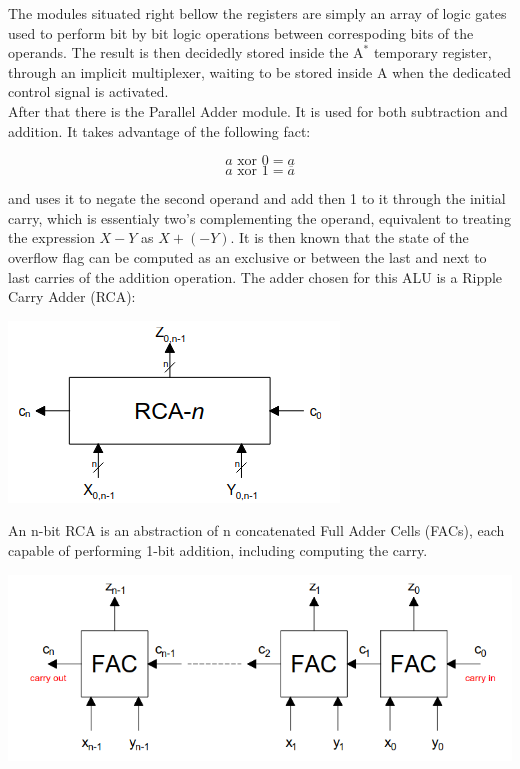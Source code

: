 \documentclass[12pt, letterpaper]{article}
\begin{document}
The modules situated right bellow the registers are simply an array of logic gates used to perform bit by bit logic operations between correspoding bits
of the operands. The result is then decidedly stored inside the $\text{A}^*$ temporary register, through an implicit multiplexer, waiting to be stored
inside A when the dedicated control signal is activated.\\

After that there is the Parallel Adder module. It is used for both subtraction and addition. It takes advantage of the following fact:

\[ a \text{ xor } 0 = a \]
\[ a \text{ xor } 1 = \overline{a} \]

and uses it to negate the second operand and add then 1 to it through the initial carry, which is essentialy two's complementing the operand, equivalent
to treating the expression $X - Y$ as $X + (-Y)$. It is then known that the state of the overflow flag can be computed as an exclusive or between
the last and next to last carries of the addition operation. The adder chosen for this ALU is a Ripple Carry Adder (RCA):

\begin{center}
\includegraphics[scale=0.5]{Documentation/RCA}
\end{center}

An n-bit RCA is an abstraction of n concatenated Full Adder Cells (FACs), each capable of performing 1-bit addition, including computing the carry.

\begin{center}
\includegraphics[scale=0.5]{Documentation/FACs}
\end{center}
\end{document}
